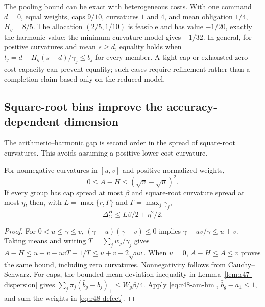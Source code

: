 The pooling bound can be exact with heterogeneous costs. With one command $d=0$, equal weights, caps $9/10$, curvatures $1$ and $4$, and mean obligation $1/4$, $H_g=8/5$. The allocation $(2/5,1/10)$ is feasible and has value $-1/20$, exactly the harmonic value; the minimum-curvature model gives $-1/32$. In general, for positive curvatures and mean $s\geq d$, equality holds when $t_j=d+H_g(s-d)/\gamma_j\leq b_j$ for every member. A tight cap or exhausted zero-cost capacity can prevent equality; such cases require refinement rather than a completion claim based only on the reduced model.

\subsection{Square-root bins improve the accuracy-dependent dimension}
The arithmetic--harmonic gap is second order in the spread of square-root curvatures. This avoids assuming a positive lower cost curvature.
\begin{lemma}\label{lem:r48-square}
For nonnegative curvatures in $[u,v]$ and positive normalized weights,
\begin{equation}\label{eq:r48-am-hm}
 0\leq A-H\leq(\sqrt v-\sqrt u)^2.
\end{equation}
If every group has cap spread at most $\beta$ and square-root curvature spread at most $\eta$, then, with $L=\max\{r,\Gamma\}$ and $\Gamma=\max_j\gamma_j$,
\begin{equation}\label{eq:r48-binned}
 \Delta_G^H\leq L\beta/2+\eta^2/2.
\end{equation}
\end{lemma}
\begin{proof}
For $0<u\leq\gamma\leq v$, $(\gamma-u)(\gamma-v)\leq0$ implies $\gamma+uv/\gamma\leq u+v$. Taking means and writing $T=\sum_jw_j/\gamma_j$ gives
$A-H\leq u+v-uvT-1/T\leq u+v-2\sqrt{uv}$.
When $u=0$, $A-H\leq A\leq v$ proves the same bound, including zero curvatures. Nonnegativity follows from Cauchy--Schwarz. For caps, the bounded-mean deviation inequality in Lemma~\ref{lem:r47-dispersion} gives $\sum_j\pi_j(\bar b_g-b_j)_+\leq W_g\beta/4$. Apply \eqref{eq:r48-am-hm}, $\bar b_g-a_1\leq1$, and sum the weights in \eqref{eq:r48-defect}.
\end{proof}

